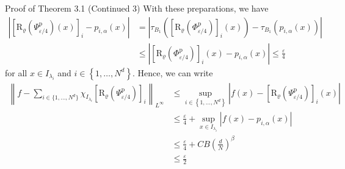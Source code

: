 \documentclass{if-beamer}
\newcommand{\norm}[2]{\left\lVert#1\right\rVert_{#2}}
\begin{document}
\begin{frame}{Proof of Theorem 3.1 (Continued 3)}
    With these preparations, we have 
    \begin{align*}
        \left|\left[\mathrm{R}_{\varrho}\left(\Psi_{\varepsilon / 4}^{\mathrm{p}}\right)(x)\right]_{i}-p_{i, \alpha}(x)\right| &= \left|\tau_{B_{1}}\left(\left[\mathrm{R}_{\varrho}\left(\Phi_{\varepsilon / 4}^{\mathrm{p}}\right)\right]_i(x)\right)-\tau_{B_{1}}\left(p_{i, \alpha}(x)\right)\right|\\
        &\leq\left|\left[\mathrm{R}_{\varrho}\left(\Phi_{\varepsilon / 4}^{\mathrm{p}}\right)\right]_i(x)-p_{i, \alpha}(x)\right| \leq \frac{\varepsilon}{4}
    \end{align*}
    for all $x \in I_{\lambda_{i}}$ and $i \in\left\{1, \ldots, N^{d}\right\}$. Hence, we can write
    {\small
    \begin{align*}
        \norm{f-\sum_{i \in\{1, \ldots, N^{d}\}} \chi_{I_{\lambda_{i}}}\left[\mathrm{R}_{\varrho}\left(\Psi_{\varepsilon / 4}^{\mathrm{p}}\right)\right]_{i}}{L^{\infty}} & \leq \sup _{i \in\left\{1, \ldots, N^{d}\right\}}\left|f(x)-\left[\mathrm{R}_{\varrho}\left(\Psi_{\varepsilon / 4}^{\mathrm{p}}\right)\right]_{i}(x)\right| \\
        & \leq \frac{\varepsilon}{4}+\sup _{x \in I_{\lambda_{i}}}\left|f(x)-p_{i, \alpha}(x)\right|\\ 
        &\leq \frac{\varepsilon}{4}+C B\left(\frac{d}{N}\right)^{\beta} \\
        &\leq \frac{\varepsilon}{2}
    \end{align*}
    }%
\end{frame}
\end{document}
